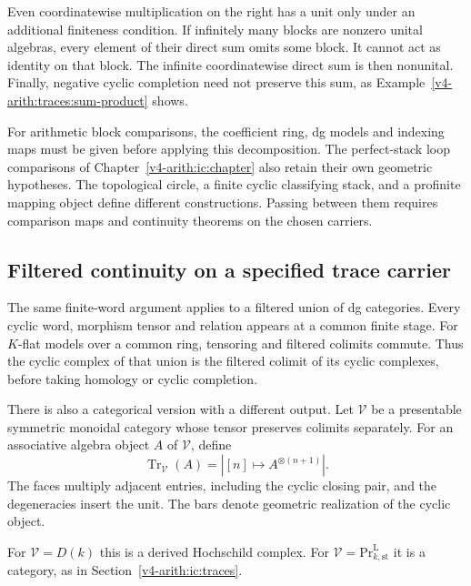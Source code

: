 Even coordinatewise multiplication on the right has a unit only under an
additional finiteness condition. If infinitely many blocks are nonzero
unital algebras, every element of their direct sum omits some block. It
cannot act as identity on that block. The infinite coordinatewise direct sum
is then nonunital. Finally, negative cyclic completion need not preserve
this sum, as Example~\ref{v4-arith:traces:sum-product} shows.

For arithmetic block comparisons, the coefficient ring, dg models and
indexing maps must be given before applying this decomposition. The
perfect-stack loop comparisons of Chapter~\ref{v4-arith:ic:chapter} also
retain their own geometric hypotheses. The topological circle, a finite
cyclic classifying stack, and a profinite mapping object define different
constructions. Passing between them requires comparison maps and continuity
theorems on the chosen carriers.

\subsection{Filtered continuity on a specified trace carrier}

The same finite-word argument applies to a filtered union of dg categories.
Every cyclic word, morphism tensor and relation appears at a common finite
stage. For $K$-flat models over a common ring, tensoring and filtered
colimits commute. Thus the cyclic complex of that union is the filtered
colimit of its cyclic complexes, before taking homology or cyclic
completion.

There is also a categorical version with a different output. Let $\mathcal
V$ be a presentable symmetric monoidal category whose tensor preserves
colimits separately. For an associative algebra object $A$ of $\mathcal V$,
define
\[
 \operatorname{Tr}_{\mathcal V}(A)
    =\left|[n]\longmapsto A^{\otimes(n+1)}\right|.
\]
The faces multiply adjacent entries, including the cyclic closing pair, and
the degeneracies insert the unit. The bars denote geometric realization of
the cyclic object.

For $\mathcal V=D(k)$ this is a derived Hochschild complex. For $\mathcal
V=\mathrm{Pr}^{\mathrm L}_{k,\mathrm{st}}$ it is a category, as in
Section~\ref{v4-arith:ic:traces}.


